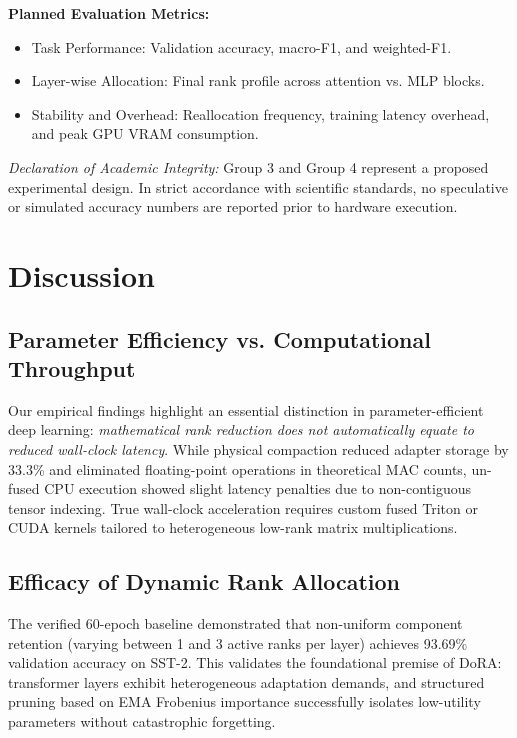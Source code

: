 \documentclass[conference]{IEEEtran}
\begin{document}
\textbf{Planned Evaluation Metrics:}
\begin{itemize}
  \item Task Performance: Validation accuracy, macro-F1, and weighted-F1.
  \item Layer-wise Allocation: Final rank profile across attention vs. MLP blocks.
  \item Stability and Overhead: Reallocation frequency, training latency overhead, and peak GPU VRAM consumption.
\end{itemize}
\textit{Declaration of Academic Integrity:} Group 3 and Group 4 represent a proposed experimental design. In strict accordance with scientific standards, no speculative or simulated accuracy numbers are reported prior to hardware execution.

\section{Discussion}
\label{sec:discussion}

\subsection{Parameter Efficiency vs. Computational Throughput}
Our empirical findings highlight an essential distinction in parameter-efficient deep learning: \textit{mathematical rank reduction does not automatically equate to reduced wall-clock latency}. While physical compaction reduced adapter storage by 33.3\% and eliminated floating-point operations in theoretical MAC counts, un-fused CPU execution showed slight latency penalties due to non-contiguous tensor indexing. True wall-clock acceleration requires custom fused Triton or CUDA kernels tailored to heterogeneous low-rank matrix multiplications.

\subsection{Efficacy of Dynamic Rank Allocation}
The verified 60-epoch baseline demonstrated that non-uniform component retention (varying between 1 and 3 active ranks per layer) achieves 93.69\% validation accuracy on SST-2. This validates the foundational premise of DoRA: transformer layers exhibit heterogeneous adaptation demands, and structured pruning based on EMA Frobenius importance successfully isolates low-utility parameters without catastrophic forgetting.
\end{document}
